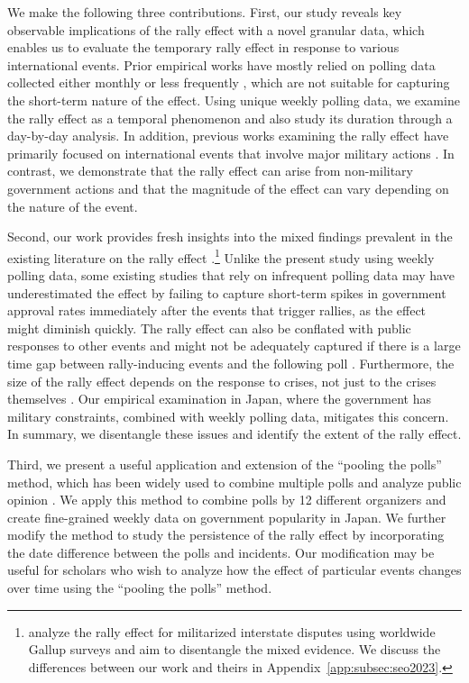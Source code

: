 \documentclass[letterpaper,12pt]{scrartcl}
\begin{document}
We make the following three contributions. First, our study reveals key observable implications of the rally effect with a novel granular data, which enables us to evaluate the temporary rally effect in response to various international events. Prior empirical works have mostly relied on polling data collected either monthly \citep{marra1990,Parker1995POQ,Baker2001JCR,Lai2005ISQ} or less frequently \citep{lee1977,Kam2008POQ}, which are not suitable for capturing the short-term nature of the effect. Using unique weekly polling data, we examine the rally effect as a temporal phenomenon and also study its duration through a day-by-day analysis. In addition, previous works examining the rally effect have primarily focused on international events that involve major military actions \citep[e.g.,][]{oneal1996,Lai2005ISQ}. In contrast, we demonstrate that the rally effect can arise from non-military government actions and that the magnitude of the effect can vary depending on the nature of the event.

Second, our work provides fresh insights into the mixed findings prevalent in the existing literature on the rally effect \citep{newport2021}.\footnote{\citet{seo2023} analyze the rally effect for militarized interstate disputes using worldwide Gallup surveys and aim to disentangle the mixed evidence. We discuss the differences between our work and theirs in Appendix~\ref{app:subsec:seo2023}.} Unlike the present study using weekly polling data, some existing studies that rely on infrequent polling data may have underestimated the effect by failing to capture short-term spikes in government approval rates immediately after the events that trigger rallies, as the effect might diminish quickly. The rally effect can also be conflated with public responses to other events and might not be adequately captured if there is a large time gap between rally-inducing events and the following poll \citep{Oneal1995PolitBehav}. Furthermore, the size of the rally effect depends on the response to crises, not just to the crises themselves \citep{James1998PRQ}. Our empirical examination in Japan, where the government has military constraints, combined with weekly polling data, mitigates this concern. In summary, we disentangle these issues and identify the extent of the rally effect.

Third, we present a useful application and extension of the ``pooling the polls'' method, which has been widely used to combine multiple polls and analyze public opinion \citep{Jackman2005AustJPolitSci}. We apply this method to combine polls by 12 different organizers and create fine-grained weekly data on government popularity in Japan. We further modify the method to study the persistence of the rally effect by incorporating the date difference between the polls and incidents. Our modification may be useful for scholars who wish to analyze how the effect of particular events changes over time using the ``pooling the polls'' method.
\end{document}
